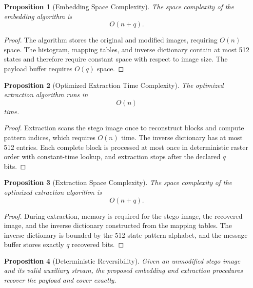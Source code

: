 \documentclass[a4paper,fleqn]{cas-dc}
\newtheorem{proposition}{Proposition}[section]
\begin{document}
\begin{proposition}[Embedding Space Complexity]
The space complexity of the embedding algorithm is
\begin{equation}
O(n+q).
\label{eq:embedding-space}
\end{equation}
\end{proposition}

\begin{proof}
The algorithm stores the original and modified images, requiring $O(n)$ space.
The histogram, mapping tables, and inverse dictionary contain at most 512
states and therefore require constant space with respect to image size. The
payload buffer requires $O(q)$ space.
\end{proof}

\begin{proposition}[Optimized Extraction Time Complexity]
The optimized extraction algorithm runs in
\begin{equation}
O(n)
\label{eq:extraction-time}
\end{equation}
time.
\end{proposition}

\begin{proof}
Extraction scans the stego image once to reconstruct blocks and compute pattern
indices, which requires $O(n)$ time.
The inverse dictionary has at most 512 entries. Each complete block is
processed at most once in deterministic raster order with constant-time
lookup, and extraction stops after the declared $q$ bits.
\end{proof}

\begin{proposition}[Extraction Space Complexity]
The space complexity of the optimized extraction algorithm is
\begin{equation}
O(n+q).
\label{eq:extraction-space}
\end{equation}
\end{proposition}

\begin{proof}
During extraction, memory is required for the stego image, the recovered image,
and the inverse dictionary constructed from the mapping tables.
The inverse dictionary is bounded by the 512-state pattern alphabet, and the
message buffer stores exactly $q$ recovered bits.
\end{proof}

\begin{proposition}[Deterministic Reversibility]
Given an unmodified stego image and its valid auxiliary stream, the proposed
embedding and extraction procedures recover the payload and cover exactly.
\end{proposition}
\end{document}

